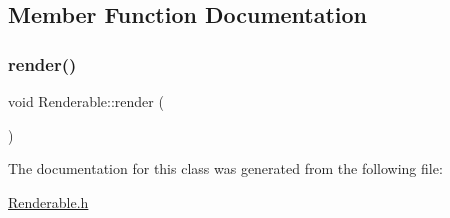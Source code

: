 \subsection{Member Function Documentation}
\mbox{\label{classRenderable_a1dce45c4703b60fd30acf824c77df9b6}} 
\subsubsection{\texorpdfstring{render()}{render()}}
{\footnotesize\ttfamily void Renderable\+::render (\begin{DoxyParamCaption}{ }\end{DoxyParamCaption})}



The documentation for this class was generated from the following file\+:\begin{DoxyCompactItemize}
\item 
\mbox{\hyperlink{Renderable_8h}{Renderable.\+h}}\end{DoxyCompactItemize}
